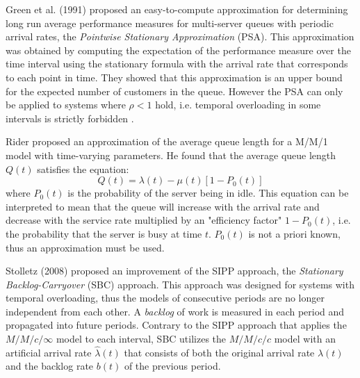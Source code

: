 Green et al. (1991) \cite{green1991} proposed an easy-to-compute approximation for determining long run average performance measures for multi-server queues with periodic arrival rates, the \emph{Pointwise Stationary Approximation} (PSA). This approximation was obtained by computing the expectation of the performance measure over the time interval using the stationary formula with the arrival rate that corresponds to each point in time. They showed that this approximation is an upper bound for the expected number of customers in the queue. However the PSA can only be applied to systems where \( \rho < 1\) hold, i.e. temporal overloading in some intervals is strictly forbidden \cite{stolletz}.

Rider \cite{rider} proposed an approximation of the average queue length for a M/M/1 model with time-varying parameters. He found that the average queue length \( Q(t) \) satisfies the equation:
\[ Q(t) = \lambda(t) - \mu(t) [1 - P_0(t)] \]
where \( P_0(t) \) is the probability of the server being in idle. This equation can be interpreted to mean that the queue will increase with the arrival rate and decrease with the service rate multiplied by an "efficiency factor" \( 1 - P_0(t) \), i.e. the probability that the server is busy at time \( t \). \( P_0(t) \) is not a priori known, thus an approximation must be used. %

Stolletz (2008) \cite{stolletz} proposed an improvement of the SIPP approach, the \emph{Stationary Backlog-Carryover} (SBC) approach. This approach was designed for systems with temporal overloading, thus the models of consecutive periods are no longer independent from each other. A \emph{backlog} of work is measured in each period and propagated into future periods. Contrary to the SIPP approach that applies the \( M/M/c/\infty \) model to each interval, SBC utilizes the \( M/M/c/c \) model with an artificial arrival rate \( \hat{\lambda}(t) \) that consists of both the original arrival rate \( \lambda(t) \) and the backlog rate \( b(t) \) of the previous period.



\clearpage